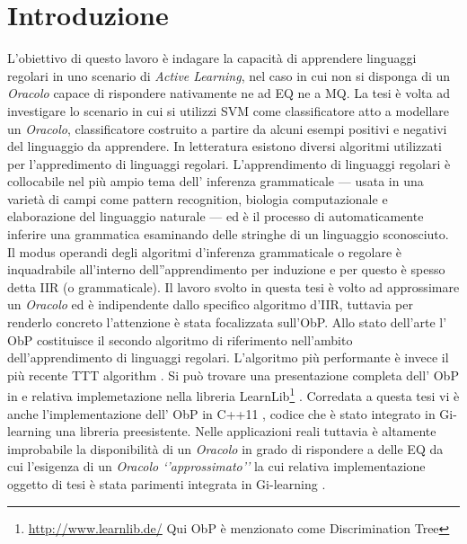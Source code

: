 

\chapter*{Introduzione} %
\label{cap:intro}

L'obiettivo di questo lavoro è indagare la capacità di apprendere linguaggi regolari in uno scenario di \textit{Active Learning}, nel caso in cui non si disponga di un \textit{Oracolo} capace di rispondere nativamente ne ad \ac{EQ} ne a \ac{MQ}. La tesi è volta ad investigare lo scenario in cui si utilizzi \ac{SVM} come classificatore atto a modellare un \textit{Oracolo}, classificatore costruito a partire da alcuni esempi positivi e negativi del linguaggio da apprendere. In letteratura esistono diversi algoritmi utilizzati per  l'appredimento di linguaggi regolari. L'apprendimento di linguaggi regolari è collocabile nel più ampio tema dell' inferenza grammaticale --- usata in una varietà di campi come pattern recognition, biologia computazionale e elaborazione del linguaggio naturale --- ed è il processo di automaticamente inferire una grammatica esaminando delle stringhe di un linguaggio sconosciuto.
Il modus operandi degli algoritmi d'inferenza grammaticale o regolare  è inquadrabile all'interno dell''apprendimento per induzione e per questo è spesso detta \ac{IIR}  (o grammaticale).
Il lavoro svolto in questa tesi è volto ad approssimare un \textit{Oracolo} ed è  indipendente dallo specifico algoritmo d'\ac{IIR}, tuttavia per renderlo concreto l'attenzione è stata focalizzata sull'\ac{ObP}.
Allo stato dell'arte l' \ac{ObP} costituisce il secondo algoritmo di riferimento nell'ambito dell'apprendimento di linguaggi regolari.  L'algoritmo più performante è invece il più recente TTT algorithm \cite{SteffenTTT14}.
Si può trovare una presentazione completa dell' \ac{ObP}  in \cite{Howar12} e relativa implemetazione nella libreria LearnLib\footnote{\href{http://www.learnlib.de/}{http://www.learnlib.de/} Qui \ac{ObP} è menzionato come Discrimination Tree} .  Corredata a questa tesi vi è anche l'implementazione dell' \ac{ObP} in C++11 , codice che è stato integrato in  Gi-learning \cite{Cot16} una libreria preesistente. Nelle applicazioni reali tuttavia è altamente improbabile la disponibilità di un \textit{Oracolo} in grado di rispondere a delle \ac{EQ} da cui l'esigenza di un \textit{Oracolo `'approssimato''} la cui relativa implementazione oggetto di tesi è stata parimenti integrata in  Gi-learning \cite{Cot16}.
